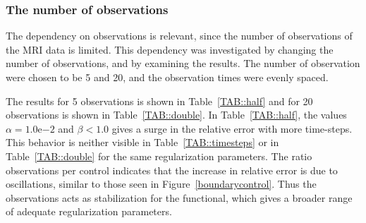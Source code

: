 \documentclass[11pt,a4paper]{article}
\begin{document}
\subsubsection{The number of observations}
The dependency on observations is relevant, since the number of observations of the MRI data is limited. This dependency was investigated by changing the number of observations, and by examining the results. The number of observation were chosen to be 5 and 20, and the observation times were evenly spaced. 

The results for 5 observations is shown in Table~\ref{TAB::half} and for 20 observations is shown in Table~\ref{TAB::double}. In Table~\ref{TAB::half}, the values $\alpha =1.0\mathrm{e}{-2}$ and $\beta<1.0$ gives a surge in the relative error with more time-steps. This behavior is neither visible in Table~\ref{TAB::timesteps} or in  Table~\ref{TAB::double} for the same regularization parameters. The ratio observations per control indicates that the increase in relative error is due to oscillations, similar to those seen in Figure~\ref{boundarycontrol}. Thus the observations acts as stabilization for the functional, which gives a broader range of adequate regularization parameters.
\end{document}
